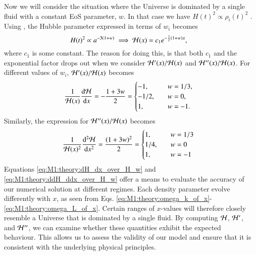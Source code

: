 Now we will consider the situation where the Universe is dominated by a single fluid with a constant EoS parameter, $w$. In that case we have $H(t)^2 \propto \rho_i(t)^2$ \cite[Eq. (3.13)]{Dodelson}. Using , the Hubble parameter expressed in terms of $w_i$ becomes  
\begin{equation}
    H(t)^2 \propto a^{-3(1+w)}\implies \mathcal{H}(x) = c_1 e^{-\frac{3}{2}(1+w)x}, \label{eq:M1:theory:Hx_eos_wi}
\end{equation}
where $c_1$ is some constant. The reason for doing this, is that both $c_1$ and the exponential factor drops out when we consider $\mathcal{H}'(x)/\mathcal{H}(x)$ and $\mathcal{H}''(x)/\mathcal{H}(x)$. For different values of $w_i$, $\mathcal{H}'(x)/\mathcal{H}(x)$ becomes    
\begin{equation} \label{eq:M1:theory:dH_dx_over_H_w}
    \frac{1}{\mathcal{H}(x)}\dv{\mathcal{H}}{x} = - \frac{1+3w}{2} = 
    \begin{cases}
        -1,\quad & w=1/3, \\ 
        -1/2, \quad & w=0, \\ 
        1, \quad & w=-1.
    \end{cases} 
\end{equation}  
%
Similarly, the expression for $\mathcal{H}''(x)/\mathcal{H}(x)$ becomes  
\begin{equation} \label{eq:M1:theory:ddH_ddx_over_H_w}
    \frac{1}{\mathcal{H}(x)^2}\dv[2]{\mathcal{H}}{x} = \frac{(1+3w)^2}{2} = 
    \begin{cases}
        1,\quad & w=1/3 \\ 
        1/4,\quad & w=0 \\ 
        1,\quad & w=-1 
    \end{cases}
\end{equation}
%  
Equations \eqref{eq:M1:theory:dH_dx_over_H_w} and \eqref{eq:M1:theory:ddH_ddx_over_H_w} offer a means to evaluate the accuracy of our numerical solution at different regimes. Each density parameter evolve differently with $x$, as seen from Eqs. \eqref{eq:M1:theory:omega_k_of_x}-\eqref{eq:M1:theory:omega_L_of_x}. Certain ranges of $x$-values will therefore closely resemble a Universe that is dominated by a single fluid. By computing $\mathcal{H}$, $\mathcal{H}'$, and $\mathcal{H}''$, we can examine whether these quantities exhibit the expected behaviour. This allows us to assess the validity of our model and ensure that it is consistent with the underlying physical principles.
